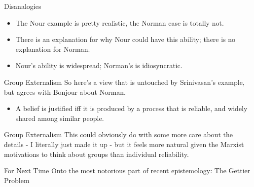 \documentclass[
  17pt,
  letterpaper,
  ignorenonframetext,
  aspectratio=169,
]{beamer}
\providecommand{\tightlist}{%
  \setlength{\itemsep}{0pt}\setlength{\parskip}{0pt}}\usepackage{longtable,booktabs,array}
\begin{document}
\begin{frame}{Disanalogies}
\protect\hypertarget{disanalogies}{}
\begin{itemize}[<+->]
\tightlist
\item
  The Nour example is pretty realistic, the Norman case is totally not.
\item
  There is an explanation for why Nour could have this ability; there is
  no explanation for Norman.
\item
  Nour's ability is widespread; Norman's is idiosyncratic.
\end{itemize}
\end{frame}

\begin{frame}{Group Externalism}
\protect\hypertarget{group-externalism}{}
So here's a view that is untouched by Srinivasan's example, but agrees
with Bonjour about Norman.

\begin{itemize}[<+->]
\tightlist
\item
  A belief is justified iff it is produced by a process that is
  reliable, and widely shared among similar people.
\end{itemize}
\end{frame}

\begin{frame}{Group Externalism}
\protect\hypertarget{group-externalism-1}{}
This could obviously do with some more care about the details - I
literally just made it up - but it feels more natural given the Marxist
motivations to think about groups than individual reliability.
\end{frame}

\begin{frame}{For Next Time}
\protect\hypertarget{for-next-time}{}
Onto the most notorious part of recent epistemology: The Gettier Problem
\end{frame}
\end{document}

